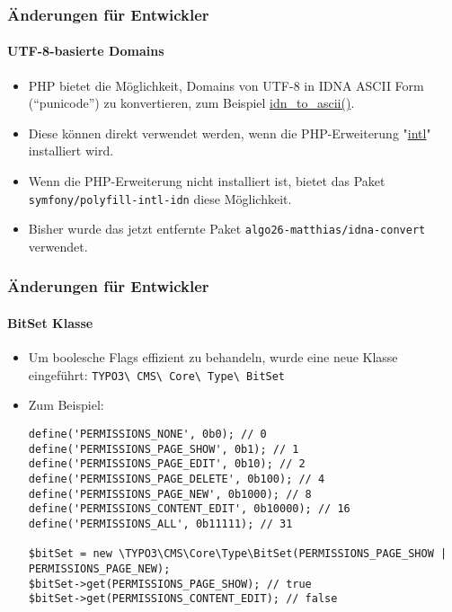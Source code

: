 \begin{frame}[fragile]
	\frametitle{Änderungen für Entwickler}
	\framesubtitle{UTF-8-basierte Domains}

	\begin{itemize}
		\item PHP bietet die Möglichkeit, Domains von UTF-8 in IDNA ASCII Form (“punicode”) zu konvertieren,
			zum Beispiel \href{https://www.php.net/manual/en/function.idn-to-ascii.php}{idn\_to\_ascii()}.

		\item Diese können direkt verwendet werden, wenn die PHP-Erweiterung
			"\href{https://www.php.net/manual/en/book.intl.php}{intl}" installiert wird.

		\item Wenn die PHP-Erweiterung nicht installiert ist, bietet das Paket \texttt{symfony/polyfill-intl-idn}
			diese Möglichkeit.

		\item Bisher wurde das jetzt entfernte Paket \texttt{algo26-matthias/idna-convert} verwendet.

	\end{itemize}

\end{frame}


\begin{frame}[fragile]
	\frametitle{Änderungen für Entwickler}
	\framesubtitle{BitSet Klasse}

	\lstset{basicstyle=\tiny\ttfamily}

	\begin{itemize}
		\item Um boolesche Flags effizient zu behandeln, wurde eine neue Klasse eingeführt:\newline
			\texttt{TYPO3\textbackslash
				CMS\textbackslash
				Core\textbackslash
				Type\textbackslash
				BitSet}

		\item Zum Beispiel:

\begin{lstlisting}
define('PERMISSIONS_NONE', 0b0); // 0
define('PERMISSIONS_PAGE_SHOW', 0b1); // 1
define('PERMISSIONS_PAGE_EDIT', 0b10); // 2
define('PERMISSIONS_PAGE_DELETE', 0b100); // 4
define('PERMISSIONS_PAGE_NEW', 0b1000); // 8
define('PERMISSIONS_CONTENT_EDIT', 0b10000); // 16
define('PERMISSIONS_ALL', 0b11111); // 31

$bitSet = new \TYPO3\CMS\Core\Type\BitSet(PERMISSIONS_PAGE_SHOW | PERMISSIONS_PAGE_NEW);
$bitSet->get(PERMISSIONS_PAGE_SHOW); // true
$bitSet->get(PERMISSIONS_CONTENT_EDIT); // false
\end{lstlisting}

	\end{itemize}

\end{frame}

